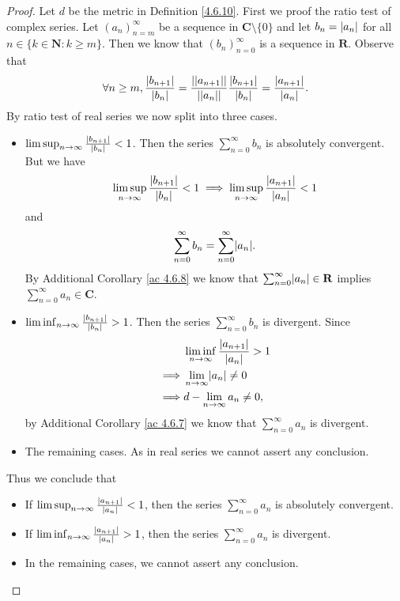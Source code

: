 \begin{proof}
    Let \(d\) be the metric in Definition \ref{4.6.10}.
    First we proof the ratio test of complex series.
    Let \((a_n)_{n = m}^\infty\) be a sequence in \(\mathbf{C} \setminus \{0\}\) and let \(b_n = \abs*{a_n}\) for all \(n \in \{k \in \mathbf{N} : k \geq m\}\).
    Then we know that \((b_n)_{n = 0}^\infty\) is a sequence in \(\mathbf{R}\).
    Observe that
    \[
        \forall n \geq m, \frac{\abs*{b_{n + 1}}}{\abs*{b_n}} = \frac{\abs*{\abs*{a_{n + 1}}}}{\abs*{\abs*{a_n}}} \frac{\abs*{b_{n + 1}}}{\abs*{b_n}} = \frac{\abs*{a_{n + 1}}}{\abs*{a_n}}.
    \]
    By ratio test of real series we now split into three cases.
    \begin{itemize}
        \item \(\limsup_{n \to \infty} \frac{\abs*{b_{n + 1}}}{\abs*{b_n}} < 1\).
              Then the series \(\sum_{n = 0}^\infty b_n\) is absolutely convergent.
              But we have
              \[
                  \limsup_{n \to \infty} \frac{\abs*{b_{n + 1}}}{\abs*{b_n}} < 1 \implies \limsup_{n \to \infty} \frac{\abs*{a_{n + 1}}}{\abs*{a_n}} < 1
              \]
              and
              \[
                  \sum_{n = 0}^\infty b_n = \sum_{n = 0}^\infty \abs*{a_n}.
              \]
              By Additional Corollary \ref{ac 4.6.8} we know that \(\sum_{n = 0}^\infty \abs*{a_n} \in \mathbf{R}\) implies \(\sum_{n = 0}^\infty a_n \in \mathbf{C}\).
        \item \(\liminf_{n \to \infty} \frac{\abs*{b_{n + 1}}}{\abs*{b_n}} > 1\).
              Then the series \(\sum_{n = 0}^\infty b_n\) is divergent.
              Since
              \begin{align*}
                           & \liminf_{n \to \infty} \frac{\abs*{a_{n + 1}}}{\abs*{a_n}} > 1 \\
                  \implies & \lim_{n \to \infty} \abs*{a_n} \neq 0                          \\
                  \implies & d - \lim_{n \to \infty} a_n \neq 0,
              \end{align*}
              by Additional Corollary \ref{ac 4.6.7} we know that \(\sum_{n = 0}^\infty a_n\) is divergent.
        \item The remaining cases.
              As in real series we cannot assert any conclusion.
    \end{itemize}
    Thus we conclude that
    \begin{itemize}
        \item If \(\limsup_{n \to \infty} \frac{\abs*{a_{n + 1}}}{\abs*{a_n}} < 1\), then the series \(\sum_{n = 0}^\infty a_n\) is absolutely convergent.
        \item If \(\liminf_{n \to \infty} \frac{\abs*{a_{n + 1}}}{\abs*{a_n}} > 1\), then the series \(\sum_{n = 0}^\infty a_n\) is divergent.
        \item In the remaining cases, we cannot assert any conclusion.
    \end{itemize}


\end{proof}
